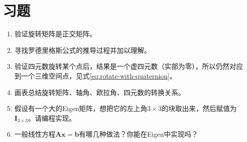 \section*{习题}
\begin{enumerate}
	\item 验证旋转矩阵是正交矩阵。
	\item[\optional] 寻找罗德里格斯公式的推导过程并加以理解。
	\item 验证四元数旋转某个点后，结果是一个虚四元数（实部为零），所以仍然对应到一个三维空间点，见式\eqref{eq:rotate-with-quaternion}。
	\item 画表总结旋转矩阵、轴角、欧拉角、四元数的转换关系。
	\item 假设有一个大的Eigen矩阵，想把它的左上角$3 \times 3$的块取出来，然后赋值为$\bm{I}_{3 \times 3}$。请编程实现。
	\item[\optional] 一般线性方程$\bm{A} \bm{x}=\bm{b}$有哪几种做法？你能在Eigen中实现吗？
\end{enumerate}